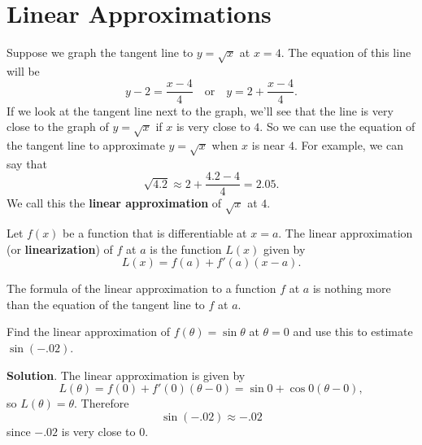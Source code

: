 \documentclass[10pt,]{book}
\newcommand{\terminology}[1]{\textbf{#1}}
\theoremstyle{ptxplainnotitle}
\theoremstyle{ptxplaintitle}
\theoremstyle{ptxplainnotitle}
\theoremstyle{ptxplaintitle}
\theoremstyle{ptxplainnotitle}
\theoremstyle{ptxplaintitle}
\theoremstyle{ptxdefinitionnotitle}
\theoremstyle{ptxdefinitiontitle}
\theoremstyle{ptxdefinitionnotitle}
\theoremstyle{ptxdefinitiontitle}
\theoremstyle{ptxdefinitionnotitle}
\theoremstyle{ptxdefinitiontitle}
\theoremstyle{ptxdefinitionnotitle}
\theoremstyle{ptxdefinitiontitle}
\theoremstyle{ptxdefinitionnotitle}
\theoremstyle{ptxdefinitiontitle}
\numberwithin{equation}{section}
\begin{document}
\typeout{************************************************}
\typeout{************************************************}
\section[{Linear Approximations}]{Linear Approximations}\label{section-linear-approximations}
\hypertarget{p-176}{}%
Suppose we graph the tangent line to \(y=\sqrt{x}\) at \(x=4\). The equation of this line will be%
\begin{equation*}
y-2 = \frac{x-4}{4}\quad\text{or}\quad y= 2 + \frac{x-4}{4}.
\end{equation*}
If we look at the tangent line next to the graph, we'll see that the line is very close to the graph of \(y=\sqrt{x}\) if \(x\) is very close to \(4\). So we can use the equation of the tangent line to approximate \(y=\sqrt{x}\) when \(x\) is near \(4\). For example, we can say that%
\begin{equation*}
\sqrt{4.2} \approx 2 + \frac{4.2 - 4}{4} = 2.05.
\end{equation*}
We call this the \terminology{linear approximation} of \(\sqrt{x}\) at \(4\).%
\begin{definition}\label{definition-linear-approximation}
\hypertarget{p-177}{}%
Let \(f(x)\) be a function that is differentiable at \(x=a\). The linear approximation (or \terminology{linearization}) of \(f\) at \(a\) is the function \(L(x)\) given by%
\begin{equation*}
L(x) = f(a) + f'(a)(x-a).
\end{equation*}
%
\end{definition}
\hypertarget{p-178}{}%
The formula of the linear approximation to a function \(f\) at \(a\) is nothing more than the equation of the tangent line to \(f\) at \(a\).%
\begin{example}\label{example-linear-approximation-of-sine}
\hypertarget{p-179}{}%
Find the linear approximation of \(f(\theta) = \sin\theta\) at \(\theta=0\) and use this to estimate \(\sin(-.02)\).%
\par\smallskip%
\noindent\textbf{Solution}.\hypertarget{solution-39}{}\quad%
\hypertarget{p-180}{}%
The linear approximation is given by%
\begin{equation*}
L(\theta) = f(0) + f'(0)(\theta - 0) = \sin0 + \cos0 (\theta - 0),
\end{equation*}
so \(L(\theta) = \theta\). Therefore%
\begin{equation*}
\sin(-.02)\approx-.02
\end{equation*}
since \(-.02\) is very close to \(0\).%
\end{example}
\end{document}
